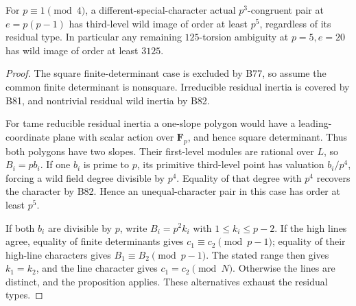 \begin{corollary}[One lower bound across all residual types at \(p=5\)]
\label{cor:B-RD83}
For \(p\equiv1\pmod4\), a different-special-character
actual \(p^3\)-congruent pair at \(e=p(p-1)\) has
third-level wild image of order at least \(p^5\), regardless
of its residual type. In particular any remaining
\(125\)-torsion ambiguity at \(p=5,e=20\) has wild image
of order at least \(3125\).
\end{corollary}
\begin{proof}
The square finite-determinant case is excluded by B77, so
assume the common finite determinant is nonsquare.
Irreducible residual inertia is covered by B81, and
nontrivial residual wild inertia by B82.

For tame reducible residual inertia a one-slope polygon
would have a leading-coordinate plane with scalar action
over \(\mathbf F_p\), and hence square determinant.
Thus both polygons have two slopes. Their first-level
modules are rational over \(L\), so \(B_i=pb_i\).
If one \(b_i\) is prime to \(p\), its primitive third-level
point has valuation \(b_i/p^4\), forcing a wild field
degree divisible by \(p^4\). Equality of that degree
with \(p^4\) recovers the character by B82. Hence an
unequal-character pair in this case has order at least
\(p^5\).

If both \(b_i\) are divisible by \(p\), write
\(B_i=p^2k_i\) with \(1\le k_i\le p-2\). If the high
lines agree, equality of finite determinants gives
\(c_1\equiv c_2\pmod{p-1}\); equality of their high-line
characters gives \(B_1\equiv B_2\pmod{p-1}\). The stated
range then gives \(k_1=k_2\), and the line character gives
\(c_1=c_2\pmod N\). Otherwise the lines are distinct,
and the proposition applies. These alternatives exhaust
the residual types.
\end{proof}

